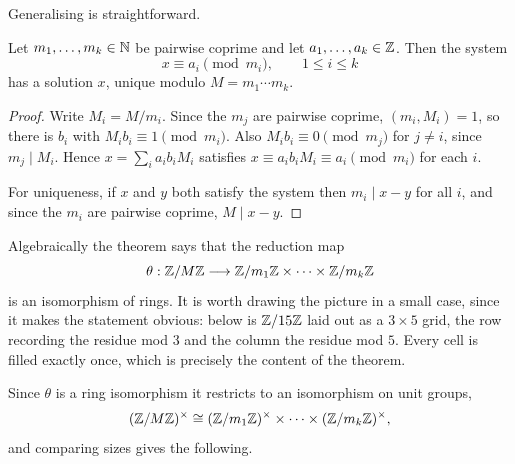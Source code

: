 \documentclass[a4paper]{scrartcl}
\begin{document}
Generalising is straightforward.

\begin{theorem}\label{thm:crt}
	Let $m_1, \dots, m_k \in \mathbb{N}$ be pairwise coprime and let $a_1, \dots, a_k \in \mathbb{Z}$. Then the system
	$$
	x \equiv a_i \pmod{m_i}, \qquad 1 \leq i \leq k
	$$
	has a solution $x$, unique modulo $M = m_1 \cdots m_k$.
\end{theorem}
\begin{proof}
	Write $M_i = M/m_i$. Since the $m_j$ are pairwise coprime, $(m_i, M_i) = 1$, so there is $b_i$ with $M_i b_i \equiv 1 \pmod{m_i}$. Also $M_i b_i \equiv 0 \pmod{m_j}$ for $j \neq i$, since $m_j \mid M_i$. Hence $x = \sum_i a_i b_i M_i$ satisfies $x \equiv a_i b_i M_i \equiv a_i \pmod{m_i}$ for each $i$.

	For uniqueness, if $x$ and $y$ both satisfy the system then $m_i \mid x - y$ for all $i$, and since the $m_i$ are pairwise coprime, $M \mid x - y$.
\end{proof}

Algebraically the theorem says that the reduction map
$$
\theta : \mathbb{Z}/M\mathbb{Z} \longrightarrow \mathbb{Z}/m_1\mathbb{Z} \times \cdots \times \mathbb{Z}/m_k\mathbb{Z}
$$
is an isomorphism of rings. It is worth drawing the picture in a small case, since it makes the statement obvious: below is $\mathbb{Z}/15\mathbb{Z}$ laid out as a $3 \times 5$ grid, the row recording the residue mod $3$ and the column the residue mod $5$. Every cell is filled exactly once, which is precisely the content of the theorem.

\begin{center}
\end{center}

Since $\theta$ is a ring isomorphism it restricts to an isomorphism on unit groups,
$$
(\mathbb{Z}/M\mathbb{Z})^\times \cong (\mathbb{Z}/m_1\mathbb{Z})^\times \times \cdots \times (\mathbb{Z}/m_k\mathbb{Z})^\times,
$$
and comparing sizes gives the following.
\end{document}

